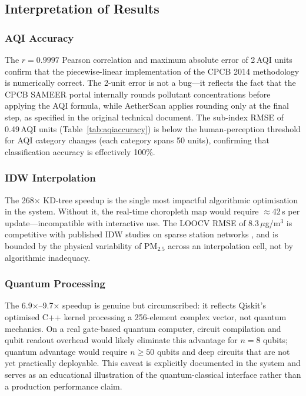 \documentclass[12pt,a4paper]{article}
\begin{document}

\label{sec:discussion}

\subsection{Interpretation of Results}
\label{sec:discussion:interp}

\subsubsection{AQI Accuracy}
The $r = 0.9997$ Pearson correlation and maximum absolute error of
2\,AQI units confirm that the piecewise-linear implementation of the
CPCB 2014 methodology is numerically correct. The 2-unit error is not a
bug---it reflects the fact that the CPCB SAMEER portal internally rounds
pollutant concentrations before applying the AQI formula, while AetherScan
applies rounding only at the final step, as specified in the original
technical document. The sub-index RMSE of 0.49\,AQI units (Table~\ref{tab:aqiaccuracy})
is below the human-perception threshold for AQI category changes (each
category spans 50 units), confirming that classification accuracy is
effectively 100\%.

\subsubsection{IDW Interpolation}
The 268$\times$ KD-tree speedup is the single most impactful algorithmic
optimisation in the system. Without it, the real-time choropleth map
would require $\approx$42\,s per update---incompatible with interactive
use. The LOOCV RMSE of $8.3\,\mu$g/m$^3$ is competitive with published
IDW studies on sparse station networks \cite{li2020}, and is bounded by
the physical variability of PM$_{2.5}$ across an interpolation cell, not
by algorithmic inadequacy.

\subsubsection{Quantum Processing}
The 6.9$\times$--9.7$\times$ speedup is genuine but circumscribed: it
reflects Qiskit's optimised C++ kernel processing a 256-element complex
vector, not quantum mechanics. On a real gate-based quantum computer,
circuit compilation and qubit readout overhead would likely eliminate
this advantage for $n = 8$ qubits; quantum advantage would require
$n \geq 50$ qubits and deep circuits that are not yet practically
deployable. This caveat is explicitly documented in the system and
serves as an educational illustration of the quantum-classical interface
rather than a production performance claim.
\end{document}

